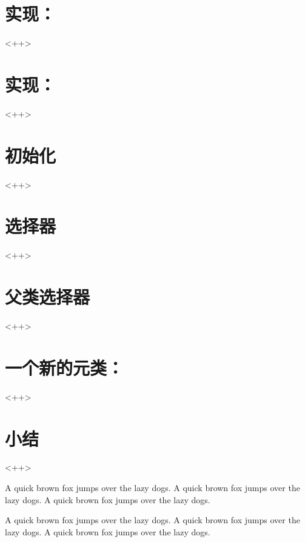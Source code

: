 \section{实现：}<++>

\section{实现：}<++>

\section{初始化}<++>

\section{选择器}<++>

\section{父类选择器}<++>

\section{一个新的元类：}<++>

\section{小结}<++>

A quick brown fox jumps over the lazy dogs.
A quick brown fox jumps over the lazy dogs.
A quick brown fox jumps over the lazy dogs.

A quick brown fox jumps over the lazy dogs.
A quick brown fox jumps over the lazy dogs.
A quick brown fox jumps over the lazy dogs.


